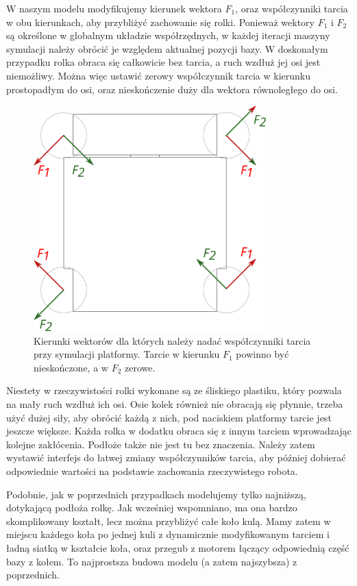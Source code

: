 W naszym modelu modyfikujemy kierunek wektora $F_1$, oraz współczynniki tarcia w obu kierunkach, aby przybliżyć zachowanie się rolki.
Ponieważ wektory $F_1$ i $F_2$ są określone w globalnym układzie współrzędnych, w każdej iteracji maszyny symulacji należy obrócić je względem aktualnej pozycji bazy.
W doskonałym przypadku rolka obraca się całkowicie bez tarcia, a ruch wzdłuż jej osi jest niemożliwy.
Można więc ustawić zerowy współczynnik tarcia w kierunku prostopadłym do osi, oraz nieskończenie duży dla wektora równoległego do osi.

\begin{figure}[H]
\centering
 \includegraphics[width=0.8\textwidth]{graphics/base_vects.pdf}
\caption{Kierunki wektorów dla których należy nadać współczynniki tarcia przy symulacji platformy. Tarcie w kierunku $F_1$ powinno być nieskończone, a w $F_2$ zerowe.}
\end{figure} 

Niestety w rzeczywistości rolki wykonane są ze śliskiego plastiku, który pozwala na mały ruch wzdłuż ich osi.
Osie kolek również nie obracają się płynnie, trzeba użyć dużej siły, aby obrócić każdą z nich, pod naciskiem platformy tarcie jest jeszcze większe.
Każda rolka w dodatku obraca się z innym tarciem wprowadzając kolejne zakłócenia.
Podłoże także nie jest tu bez znaczenia.
Należy zatem wystawić interfejs do łatwej zmiany współczynników tarcia, aby później dobierać odpowiednie wartości na podstawie zachowania rzeczywistego robota.

Podobnie, jak w poprzednich przypadkach modelujemy tylko najniższą, dotykającą podłoża rolkę.
Jak wcześniej wspomniano, ma ona bardzo skomplikowany kształt, lecz można przybliżyć całe koło kulą.
Mamy zatem w miejscu każdego koła po jednej kuli z dynamicznie modyfikowanym tarciem i ładną siatką w kształcie koła, oraz przegub z motorem łączący odpowiednią część bazy z kołem.
To najprostsza budowa modelu (a zatem najszybsza) z poprzednich.

